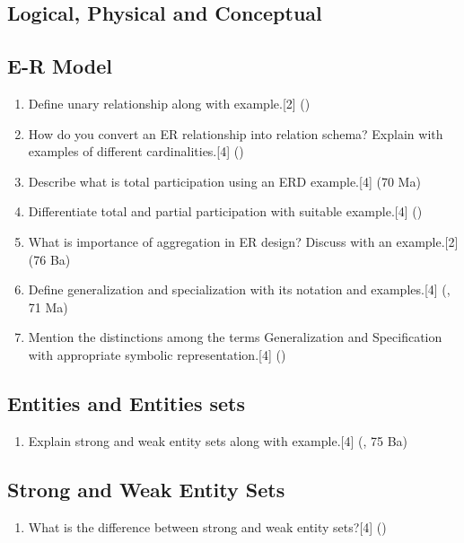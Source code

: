 \documentclass[12pt]{article}
\begin{document}
    \subsection{Logical, Physical and Conceptual}
    \subsection{E-R Model}
    \begin{enumerate}
    \item Define unary relationship along with example.\hfill[2] ()

    \item How do you convert an ER relationship into relation schema? Explain with examples of different cardinalities.\hfill[4] ()

    \item Describe what is total participation using an ERD example.\hfill[4] (70 Ma)

    \item Differentiate total and partial participation with suitable example.\hfill[4] ()

    \item What is importance of aggregation in ER design? Discuss with an example.\hfill[2] (76 Ba)

    \item Define generalization and specialization with its notation and examples.\hfill[4] (, 71 Ma)

    \item Mention the distinctions among the terms Generalization and Specification with appropriate symbolic representation.\hspace{11.9cm}[4] ()

    \end{enumerate}
    \subsection{Entities and Entities sets}
    \begin{enumerate}
    \item Explain strong and weak entity sets along with example.\hfill[4] (, 75 Ba)
    \end{enumerate}
    \subsection{Strong and Weak Entity Sets}
    \begin{enumerate}
    \item What is the difference between strong and weak entity sets?\hfill[4] ()
    \end{enumerate}
\end{document}
